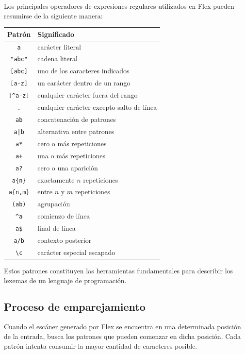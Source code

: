\documentclass{article}
\begin{document}
Los principales operadores de expresiones regulares utilizados en Flex
pueden resumirse de la siguiente manera:

\begin{center}
\begin{tabular}{c|l}
\textbf{Patrón} & \textbf{Significado} \\
\hline
\texttt{a} & carácter literal \\
\texttt{"abc"} & cadena literal \\
\texttt{[abc]} & uno de los caracteres indicados \\
\texttt{[a-z]} & un carácter dentro de un rango \\
\texttt{[\^{}a-z]} & cualquier carácter fuera del rango \\
\texttt{.} & cualquier carácter excepto salto de línea \\
\texttt{ab} & concatenación de patrones \\
\texttt{a|b} & alternativa entre patrones \\
\texttt{a*} & cero o más repeticiones \\
\texttt{a+} & una o más repeticiones \\
\texttt{a?} & cero o una aparición \\
\texttt{a\{n\}} & exactamente $n$ repeticiones \\
\texttt{a\{n,m\}} & entre $n$ y $m$ repeticiones \\
\texttt{(ab)} & agrupación \\
\texttt{\^{}a} & comienzo de línea \\
\texttt{a\$} & final de línea \\
\texttt{a/b} & contexto posterior \\
\texttt{\textbackslash c} & carácter especial escapado \\
\end{tabular}
\end{center}

Estos patrones constituyen las herramientas fundamentales para describir
los lexemas de un lenguaje de programación.

\subsection{Proceso de emparejamiento}

Cuando el escáner generado por Flex se encuentra en una determinada
posición de la entrada, busca los patrones que pueden comenzar en dicha
posición. Cada patrón intenta consumir la mayor cantidad de caracteres
posible.
\end{document}
